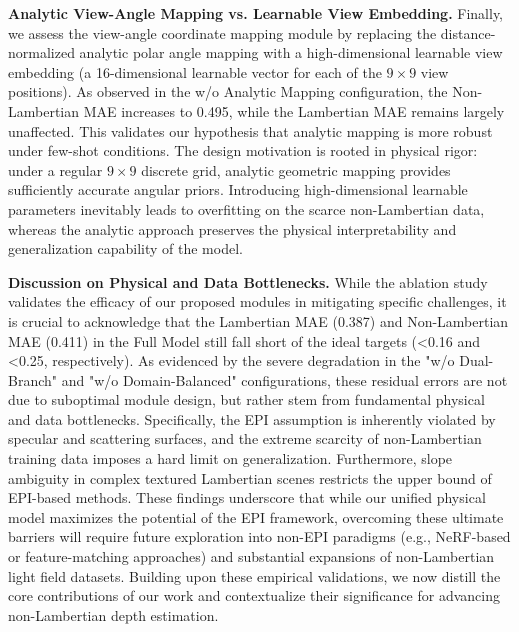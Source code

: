 \textbf{Analytic View-Angle Mapping vs. Learnable View Embedding.} 
Finally, we assess the view-angle coordinate mapping module by replacing the distance-normalized analytic polar angle mapping with a high-dimensional learnable view embedding (a 16-dimensional learnable vector for each of the $9 \times 9$ view positions). As observed in the w/o Analytic Mapping configuration, the Non-Lambertian MAE increases to 0.495, while the Lambertian MAE remains largely unaffected. This validates our hypothesis that analytic mapping is more robust under few-shot conditions. The design motivation is rooted in physical rigor: under a regular $9 \times 9$ discrete grid, analytic geometric mapping provides sufficiently accurate angular priors. Introducing high-dimensional learnable parameters inevitably leads to overfitting on the scarce non-Lambertian data, whereas the analytic approach preserves the physical interpretability and generalization capability of the model.

\textbf{Discussion on Physical and Data Bottlenecks.} 
While the ablation study validates the efficacy of our proposed modules in mitigating specific challenges, it is crucial to acknowledge that the Lambertian MAE (0.387) and Non-Lambertian MAE (0.411) in the Full Model still fall short of the ideal targets (<0.16 and <0.25, respectively). As evidenced by the severe degradation in the "w/o Dual-Branch" and "w/o Domain-Balanced" configurations, these residual errors are not due to suboptimal module design, but rather stem from fundamental physical and data bottlenecks. Specifically, the EPI assumption is inherently violated by specular and scattering surfaces, and the extreme scarcity of non-Lambertian training data imposes a hard limit on generalization. Furthermore, slope ambiguity in complex textured Lambertian scenes restricts the upper bound of EPI-based methods. These findings underscore that while our unified physical model maximizes the potential of the EPI framework, overcoming these ultimate barriers will require future exploration into non-EPI paradigms (e.g., NeRF-based or feature-matching approaches) and substantial expansions of non-Lambertian light field datasets. Building upon these empirical validations, we now distill the core contributions of our work and contextualize their significance for advancing non-Lambertian depth estimation.